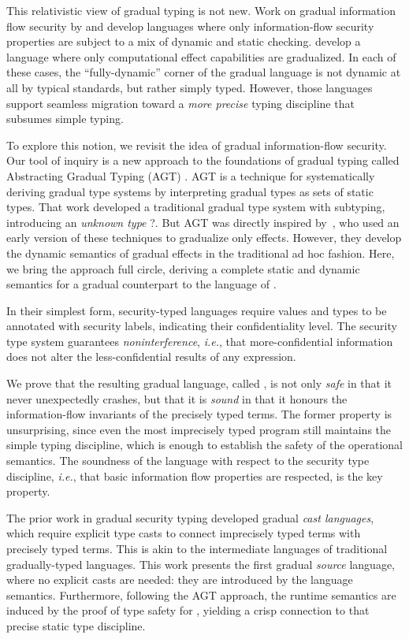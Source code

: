 \documentclass[authoryear,sort&compress,9pt,twocolumn,nocopyrightspace]{sigplanconf}
\newcommand{\lsec}{\xspace}
\newcommand{\lgsec}{\xspace}
\newcommand{\?}{\textsf{\upshape ?}} \newcommand{\consistent}[1]{\widetilde{#1}}
\newcommand{\ie}{\emph{i.e.}\xspace}
\begin{document}
This relativistic view of gradual typing is not new.  Work on gradual
information flow security by \citet{disney11flow} and
\citet{fennellThiemann:csf2013} develop languages where only information-flow
security properties are subject to a mix of dynamic and static checking.
\citet{banados14effects} develop a language where only computational effect
capabilities are gradualized.  In each of these cases, the ``fully-dynamic''
corner of the gradual language is not dynamic at all by typical standards, but
rather simply typed.  However, those languages support seamless migration
toward a \emph{more precise} typing discipline that subsumes simple typing.

To explore this notion, we revisit the idea of gradual information-flow
security.  Our tool of inquiry is a new approach to the foundations of gradual
typing called Abstracting Gradual Typing (AGT) \cite{garciaAl:popl2016}.  AGT
is a technique for systematically deriving gradual type systems by interpreting
gradual types as sets of static types.  That work developed a traditional
gradual type system with subtyping, introducing an \emph{unknown type} \?. But
AGT was directly inspired by~\citet{banados14effects}, who used an early
version of these techniques to gradualize only effects. However, they develop
the dynamic semantics of gradual effects in the traditional ad hoc fashion.
Here, we bring the approach full circle, deriving a complete static and dynamic
semantics for a gradual counterpart to the \lsec language of \citet{zdancewic}.

In their simplest form, security-typed languages require values and types to be
annotated with security labels, indicating their confidentiality level.  The
security type system guarantees \emph{noninterference}, \ie, that
more-confidential information does not alter the less-confidential results of
any expression.

We prove that the resulting gradual language, called \lgsec, is not only
\emph{safe} in that it never unexpectedly crashes, but that it is \emph{sound}
in that it honours the information-flow invariants of the precisely typed
terms.  The former property is unsurprising, since even the most imprecisely
typed program still maintains the simple typing discipline, which is enough to
establish the safety of the operational semantics.  The soundness of the
language with respect to the security type discipline, \ie, that basic
information flow properties are respected, is the key property.

The prior work in gradual security typing developed gradual \emph{cast
  languages}, which require explicit type casts to connect imprecisely typed
terms with precisely typed terms.  This is akin to the intermediate languages
of traditional gradually-typed languages.  This work presents the first gradual
\emph{source} language, where no explicit casts are needed: they are introduced
by the language semantics.  Furthermore, following the AGT approach, the
runtime semantics are induced by the proof of type safety for \lsec, yielding a
crisp connection to that precise static type discipline.
\end{document}
